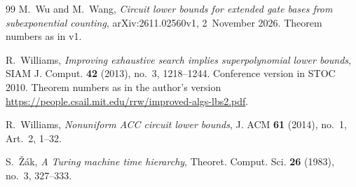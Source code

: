 \documentclass[10pt]{amsart}
\theoremstyle{plain}
\theoremstyle{definition}
\theoremstyle{remark}
\numberwithin{equation}{section}
\begin{document}
\begin{thebibliography}{99}
M.~Wu and M.~Wang, \emph{Circuit lower bounds for extended gate bases from subexponential counting},
arXiv:2611.02560v1, 2~November 2026. Theorem numbers as in v1.

R.~Williams, \emph{Improving exhaustive search implies superpolynomial lower bounds}, SIAM J. Comput.
\textbf{42} (2013), no.~3, 1218--1244. Conference version in STOC 2010. Theorem numbers as in the
author's version \url{https://people.csail.mit.edu/rrw/improved-algs-lbs2.pdf}.

R.~Williams, \emph{Nonuniform {ACC} circuit lower bounds}, J. ACM \textbf{61} (2014), no.~1, Art.~2,
1--32.

S.~\v{Z}\'ak, \emph{A {T}uring machine time hierarchy}, Theoret. Comput. Sci. \textbf{26} (1983),
no.~3, 327--333.

\end{thebibliography}
\end{document}
